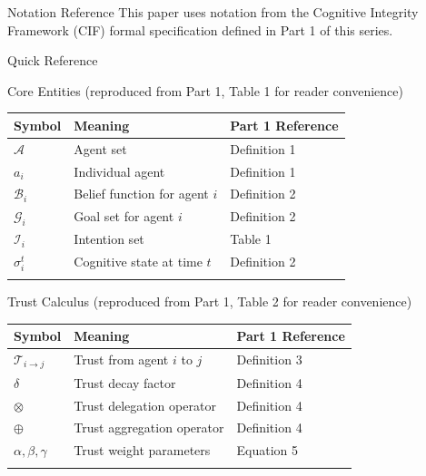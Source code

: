 \documentclass[
  ignorenonframetext,
]{beamer}
\author{\texorpdfstring{}{}}
\date{}
\newcounter{none} %
\begin{document}
\begin{frame}
\newpage
\end{frame}

\begin{frame}{Notation Reference}
\protect{}\label{sec:notation-reference}
This paper uses notation from the Cognitive Integrity Framework (CIF)
formal specification defined in Part 1 of this series.

\begin{block}{Quick Reference}
\protect{}\label{quick-reference}
\begin{block}{Core Entities (reproduced from Part 1, Table 1 for reader
convenience)}
\protect{}\label{core-entities-reproduced-from-part-1-table-1-for-reader-convenience}
{\def\LTcaptype{none} %
\begin{longtable}[]{@{}lll@{}}
\toprule\noalign{}
Symbol & Meaning & Part 1 Reference \\
\midrule\noalign{}
\endhead
\(\mathcal{A}\) & Agent set & Definition 1 \\
\(a_i\) & Individual agent & Definition 1 \\
\(\mathcal{B}_i\) & Belief function for agent \(i\) & Definition 2 \\
\(\mathcal{G}_i\) & Goal set for agent \(i\) & Definition 2 \\
\(\mathcal{I}_i\) & Intention set & Table 1 \\
\(\sigma_i^t\) & Cognitive state at time \(t\) & Definition 2 \\
\bottomrule\noalign{}
\end{longtable}
}
\end{block}

\begin{block}{Trust Calculus (reproduced from Part 1, Table 2 for reader
convenience)}
\protect{}\label{trust-calculus-reproduced-from-part-1-table-2-for-reader-convenience}
{\def\LTcaptype{none} %
\begin{longtable}[]{@{}lll@{}}
\toprule\noalign{}
Symbol & Meaning & Part 1 Reference \\
\midrule\noalign{}
\endhead
\(\mathcal{T}_{i \to j}\) & Trust from agent \(i\) to \(j\) & Definition
3 \\
\(\delta\) & Trust decay factor & Definition 4 \\
\(\otimes\) & Trust delegation operator & Definition 4 \\
\(\oplus\) & Trust aggregation operator & Definition 4 \\
\(\alpha, \beta, \gamma\) & Trust weight parameters & Equation 5 \\
\bottomrule\noalign{}
\end{longtable}
}
\end{block}


\end{block}
\end{frame}
\end{document}
